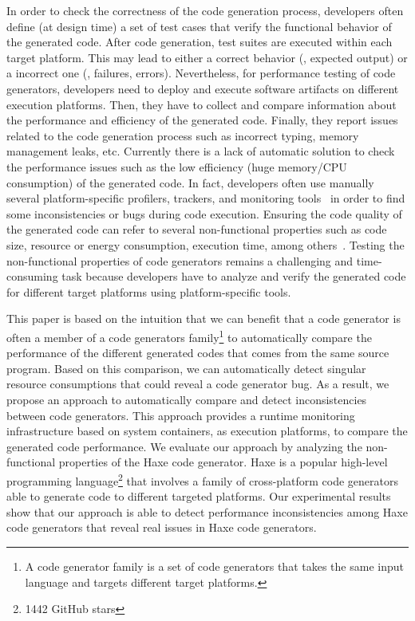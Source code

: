 In order to check the correctness of the code generation process, developers often define (at design time) a set of test cases that verify the functional behavior of the generated code. After code generation, test suites are executed within each target platform. This may lead to either a correct behavior (\ie, expected output) or a incorrect one (\ie, failures, errors).
Nevertheless, for performance testing of code generators, developers need to deploy and execute software artifacts on different execution platforms. Then, they have to collect and compare information about the performance and efficiency of the generated code. Finally, they report issues related to the code generation process such as incorrect typing, memory management leaks, etc. Currently there is a lack of automatic solution to check the performance issues such as the low efficiency (huge memory/CPU consumption) of the generated code. In fact, developers often use manually several platform-specific profilers, trackers, and monitoring tools~\cite{guana2014chaintracker,delgado2004taxonomy} in order to find some inconsistencies or bugs during code execution. Ensuring the code quality of the generated code can refer to several non-functional properties such as code size, resource or energy consumption, execution time, among others~\cite{pan2006fast}. %
Testing the non-functional properties of code generators remains a challenging and time-consuming task because developers have to analyze and verify the generated code for different target platforms using platform-specific tools.

This paper is based on the intuition that we can benefit that a code generator is often a member of a code generators family\footnote{A code generator family is a set of code generators that takes the same input language and targets different target platforms.} to automatically compare the  performance of the different generated codes that comes from the same source program. Based on this comparison, we can automatically detect singular resource consumptions that could reveal a code generator bug. As a result, we propose an approach to automatically compare and detect inconsistencies between code generators. This approach provides a runtime monitoring infrastructure based on system containers, as execution platforms, to compare the generated code performance. %
We evaluate our approach by analyzing the non-functional properties of the Haxe code generator. Haxe is a popular high-level programming language\footnote{\num{1442} GitHub stars} that involves a family of cross-platform code generators able to generate code to different targeted platforms. Our experimental results show that our approach is able to detect performance inconsistencies among Haxe code generators that reveal real issues in Haxe code generators.


